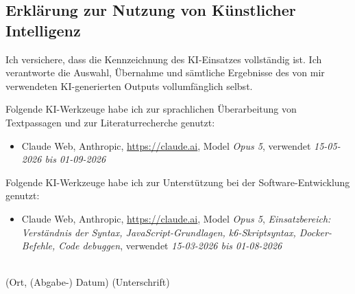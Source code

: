 \thispagestyle{empty}

\subsection*{Erklärung zur Nutzung von Künstlicher Intelligenz}

\vspace*{10pt}

\begingroup
\setlength{\emergencystretch}{3em}

\noindent
Ich versichere, dass die Kennzeichnung des KI-Einsatzes vollständig ist. Ich verantworte die
Auswahl, Übernahme und sämtliche Ergebnisse des von mir verwendeten KI-generierten Outputs
vollumfänglich selbst.

\vspace*{12pt}
\noindent
Folgende KI-Werkzeuge habe ich zur sprachlichen Überarbeitung von Textpassagen und zur
Literaturrecherche genutzt:

\begin{itemize}\setlength{\itemsep}{2pt}
    \item Claude Web, Anthropic, \url{https://claude.ai},
          Model \textit{Opus 5}, verwendet \textit{15-05-2026 bis 01-09-2026}
\end{itemize}

\vspace*{6pt}
\noindent
Folgende KI-Werkzeuge habe ich zur Unterstützung bei der Software-Entwicklung genutzt:

\begin{itemize}\setlength{\itemsep}{2pt}
    \item Claude Web, Anthropic, \url{https://claude.ai},
          Model \textit{Opus 5}, \textit{Einsatzbereich: Verständnis der Syntax, JavaScript-Grundlagen, k6-Skriptsyntax, Docker-Befehle, Code debuggen},
          verwendet \textit{15-03-2026 bis 01-08-2026}
\end{itemize}

\vspace*{6pt}
\noindent

\endgroup

\vspace*{20pt}
\noindent
\dotfill \hspace{2cm} \dotfill \\
\vspace*{20pt}
(Ort, (Abgabe-) Datum) \hfill (Unterschrift)
